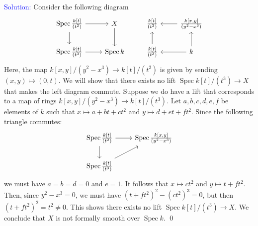 \documentclass[11pt]{article}
\DeclareMathOperator{\Spec}{\operatorname{Spec}}
\newenvironment{solution}{\begin{trivlist}\item[]{\textcolor{blue}{Solution:}}}{\qed \end{trivlist}}
\begin{document}
\begin{solution}
    Consider the following diagram 
    \[\begin{tikzcd}
        {\Spec \frac{k[t]}{(t^2)}} & {X} & {\frac{k[t]}{(t^2)}} & {\frac{k[x,y]}{(y^2 - x^3)}} \\
        {\Spec \frac{k[t]}{(t^3)}} & {\Spec k} & {\frac{k[t]}{(t^3)}} & k
        \arrow[from=1-1, to=1-2]
        \arrow[from=1-1, to=2-1]
        \arrow[from=1-2, to=2-2]
        \arrow[from=1-4, to=1-3]
        \arrow[from=2-1, to=2-2]
        \arrow[from=2-3, to=1-3]
        \arrow[from=2-4, to=1-4]
        \arrow[from=2-4, to=2-3]
    \end{tikzcd}\]
    Here, the map $k[x,y]/(y^2 - x^3) \rightarrow k[t]/(t^2)$ is given by sending $(x,y) \mapsto (0, t)$. We will show that there exists no lift $\Spec k[t]/(t^3) \rightarrow X$ that makes the left diagram commute. Suppose we do have a lift that corresponds to a map of rings $k[x,y]/(y^2 - x^3) \rightarrow k[t]/(t^3)$. Let $a,b,c,d,e,f$ be elements of $k$ such that $x \mapsto a + bt + ct^2$ and $y \mapsto d + et + ft^2$. Since the following triangle commutes:
    \[\begin{tikzcd}
        {\Spec \frac{k[t]}{(t^2)}} & {\Spec \frac{k[x,y]}{(y^2 - x^3)}} \\
        {\Spec \frac{k[t]}{(t^3)}}
        \arrow[from=1-1, to=1-2]
        \arrow[from=1-1, to=2-1]
        \arrow[from=2-1, to=1-2]
    \end{tikzcd}\]
    we must have $a = b = d = 0$ and $e = 1$. It follows that $x \mapsto ct^2$ and $y \mapsto t + ft^2$. Then, since $y^2 - x^3 = 0$, we must have $(t + ft^2)^2 - (ct^2)^3 = 0$, but then $(t + ft^2)^2 = t^2 \neq 0$. This shows there exists no lift $\Spec k[t]/(t^3) \rightarrow X$. We conclude that $X$ is not formally smooth over $\Spec k$. 
\end{solution}

\newpage
\end{document}
